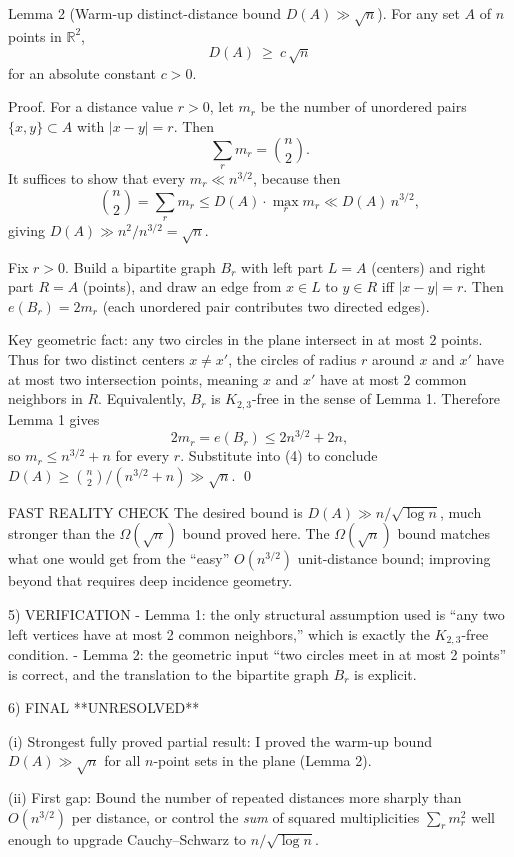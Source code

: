 Lemma 2 (Warm-up distinct-distance bound $D(A)\gg \sqrt n$).
For any set $A$ of $n$ points in $\mathbb R^2$,
\[D(A)\ \ge\ c\,\sqrt n\]
for an absolute constant $c>0$.

Proof.
For a distance value $r>0$, let $m_r$ be the number of unordered pairs $\{x,y\}\subset A$ with $|x-y|=r$.
Then
\[\sum_r m_r = \binom{n}{2}.\tag{4}\]
It suffices to show that every $m_r\ll n^{3/2}$, because then
\[\binom{n}{2}=\sum_r m_r \le D(A)\cdot \max_r m_r \ll D(A)\,n^{3/2},\]
giving $D(A)\gg n^2/n^{3/2}=\sqrt n$.

Fix $r>0$. Build a bipartite graph $B_r$ with left part $L=A$ (centers) and right part $R=A$ (points), and draw an edge from $x\in L$ to $y\in R$ iff $|x-y|=r$.
Then $e(B_r)=2m_r$ (each unordered pair contributes two directed edges).

Key geometric fact: any two circles in the plane intersect in at most $2$ points.
Thus for two distinct centers $x\ne x'$, the circles of radius $r$ around $x$ and $x'$ have at most two intersection points, meaning $x$ and $x'$ have at most $2$ common neighbors in $R$.
Equivalently, $B_r$ is $K_{2,3}$-free in the sense of Lemma 1.
Therefore Lemma 1 gives
\[2m_r=e(B_r)\le 2n^{3/2}+2n,\]
so $m_r\le n^{3/2}+n$ for every $r$.
Substitute into (4) to conclude $D(A)\ge \binom{n}{2}/(n^{3/2}+n)\gg \sqrt n$. \qed

FAST REALITY CHECK
The desired bound is $D(A)\gg n/\sqrt{\log n}$, much stronger than the $\Omega(\sqrt n)$ bound proved here.
The $\Omega(\sqrt n)$ bound matches what one would get from the ``easy'' $O(n^{3/2})$ unit-distance bound; improving beyond that requires deep incidence geometry.

5) VERIFICATION
- Lemma 1: the only structural assumption used is ``any two left vertices have at most 2 common neighbors,'' which is exactly the $K_{2,3}$-free condition.
- Lemma 2: the geometric input ``two circles meet in at most 2 points'' is correct, and the translation to the bipartite graph $B_r$ is explicit.

6) FINAL
**UNRESOLVED**

(i) Strongest fully proved partial result:
I proved the warm-up bound $D(A)\gg \sqrt n$ for all $n$-point sets in the plane (Lemma 2).

(ii) First gap:
Bound the number of repeated distances more sharply than $O(n^{3/2})$ per distance, or control the \emph{sum} of squared multiplicities $\sum_r m_r^2$ well enough to upgrade Cauchy--Schwarz to $n/\sqrt{\log n}$.

